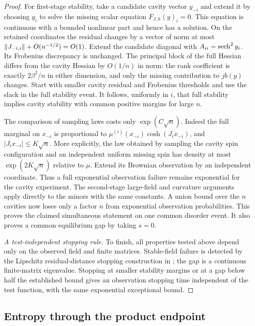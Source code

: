 \begin{proof}
For first-stage stability, take a candidate cavity vector $y_{-i}$ and
extend it by choosing $y_i$ to solve the missing scalar equation
$F_{J,h}(y)_i=0$.  This equation is continuous with a bounded nonlinear
part and hence has a solution.  On the retained coordinates the residual
changes by a vector of norm at most
$\left\lVert J_{-i,i}\right\rVert+O(n^{-1/2})=O(1)$.
Extend the candidate diagonal with $A_{ii}=\operatorname{sech}^2 y_i$.
Its Frobenius discrepancy is unchanged.  The principal block of the full
Hessian differs from the cavity Hessian by $O(1/n)$ in norm: the rank
coefficient is exactly $2\beta^2/n$ in either dimension, and only the
missing contribution to $jb(y)$ changes.  Start with smaller cavity
residual and Frobenius thresholds and use the slack in the full stability
event.  It follows, uniformly in $i$, that full stability implies cavity
stability with common positive margins for large $n$.

The comparison of sampling laws costs only $\exp(C\sqrt n)$.  Indeed the
full marginal on $x_{-i}$ is proportional to
$\mu^{(i)}(x_{-i})\cosh(J_i x_{-i})$, and
$|J_i x_{-i}|\le K\sqrt n$.  More explicitly, the law obtained by sampling
the cavity spin configuration and an independent uniform missing spin has
density at most $\exp(2K\sqrt n)$ relative to $\mu$.  Extend its Brownian
observation by an independent coordinate.  Thus a full exponential
observation failure remains exponential for the cavity experiment.
The second-stage large-field and curvature arguments apply directly to
the minors with the same constants.  A union bound over the $n$ cavities
now loses only a factor $n$ from exponential observation probabilities.
This proves the claimed simultaneous statement on one common disorder
event.  It also proves a common equilibrium gap by taking $s=0$.

\emph{A test-independent stopping rule.}
To finish, all properties tested above depend only on the observed field
and finite matrices.  Stable-field failure is detected by the Lipschitz
residual-distance stopping construction in
\cite[Corollary~5.2]{SKGap}; the gap is a continuous finite-matrix
eigenvalue.  Stopping at smaller stability margins or at a gap below half
the established bound gives an observation stopping time independent of
the test function, with the same exponential exceptional bound.
\end{proof}

\subsection{Entropy through the product endpoint}

